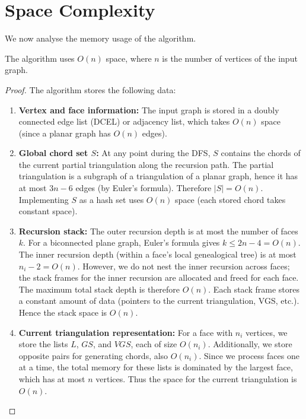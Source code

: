 \section{Space Complexity}
\label{sec:space_complexity}

We now analyse the memory usage of the algorithm.

\begin{theorem}
    \label{thm:space_complexity_final}
    The algorithm uses \(O(n)\) space, where \(n\) is the number of vertices of the input graph.
\end{theorem}

\begin{proof}
    The algorithm stores the following data:

    \begin{enumerate}
        \item \textbf{Vertex and face information:} The input graph is stored in a doubly connected edge list (DCEL) or adjacency list, which takes \(O(n)\) space (since a planar graph has \(O(n)\) edges).
        
        \item \textbf{Global chord set \(S\):} At any point during the DFS, \(S\) contains the chords of the current partial triangulation along the recursion path. 
        The partial triangulation is a subgraph of a triangulation of a planar graph, hence it has at most \(3n-6\) edges (by Euler’s formula). 
        Therefore \(|S| = O(n)\). 
        Implementing \(S\) as a hash set uses \(O(n)\) space (each stored chord takes constant space).
        
        \item \textbf{Recursion stack:} The outer recursion depth is at most the number of faces \(k\). 
        For a biconnected plane graph, Euler’s formula gives \(k \le 2n - 4 = O(n)\). 
        The inner recursion depth (within a face’s local genealogical tree) is at most \(n_i - 2 = O(n)\). 
        However, we do not nest the inner recursion across faces; the stack frames for the inner recursion are allocated and freed for each face. 
        The maximum total stack depth is therefore \(O(n)\). 
        Each stack frame stores a constant amount of data (pointers to the current triangulation, VGS, etc.). 
        Hence the stack space is \(O(n)\).
        
        \item \textbf{Current triangulation representation:} For a face with \(n_i\) vertices, we store the lists \(L\), \(GS\), and \(VGS\), each of size \(O(n_i)\). 
        Additionally, we store opposite pairs for generating chords, also \(O(n_i)\). 
        Since we process faces one at a time, the total memory for these lists is dominated by the largest face, which has at most \(n\) vertices. 
        Thus the space for the current triangulation is \(O(n)\).
        

\end{enumerate}
\end{proof}
